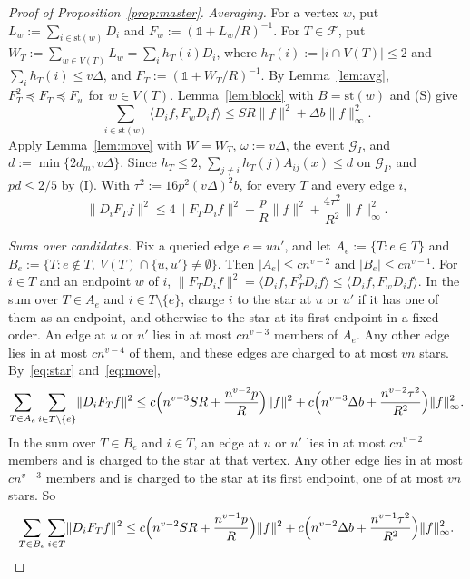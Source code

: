 \documentclass[11pt]{article}
\theoremstyle{remark}
\newcommand{\Fam}{\mathcal{F}}
\newcommand{\st}{\mathrm{st}}
\newcommand{\Id}{\mathbb{1}}
\newcommand{\abs}[1]{\lvert #1\rvert}
\newcommand{\norm}[1]{\lVert #1\rVert}
\newcommand{\ip}[2]{\langle #1, #2\rangle}
\newcommand{\Ev}{\mathcal{G}}
\begin{document}
\begin{proof}[Proof of Proposition~\ref{prop:master}]
\emph{Averaging.} For a vertex $w$, put $L_w:=\sum_{i\in\st(w)}D_i$ and $F_w:=(\Id+L_w/R)^{-1}$. For $T\in\Fam$, put $W_T:=\sum_{w\in V(T)}L_w=\sum_ih_T(i)D_i$, where $h_T(i):=\abs{i\cap V(T)}\le2$ and $\sum_ih_T(i)\le v\Delta$, and $F_T:=(\Id+W_T/R)^{-1}$. By Lemma~\ref{lem:avg}, $F_T^2\preceq F_T\preceq F_w$ for $w\in V(T)$. Lemma~\ref{lem:block} with $B=\st(w)$ and (S) give
\begin{equation}\label{eq:star}
\sum_{i\in\st(w)}\ip{D_if}{F_wD_if}\le SR\norm f^2+\Delta b\norm f_\infty^2.
\end{equation}
Apply Lemma~\ref{lem:move} with $W=W_T$, $\omega:=v\Delta$, the event $\Ev_I$, and $d:=\min\{2d_m,v\Delta\}$. Since $h_T\le2$, $\sum_{j\ne i}h_T(j)A_{ij}(x)\le d$ on $\Ev_I$, and $pd\le2/5$ by (I). With $\tau^2:=16p^2(v\Delta)^2b$, for every $T$ and every edge $i$,
\begin{equation}\label{eq:move}
\norm{D_iF_Tf}^2\le4\norm{F_TD_if}^2+\frac pR\norm f^2+\frac{4\tau^2}{R^2}\norm f_\infty^2.
\end{equation}

\emph{Sums over candidates.} Fix a queried edge $e=uu'$, and let $A_e:=\{T:e\in T\}$ and $B_e:=\{T:e\notin T,\ V(T)\cap\{u,u'\}\ne\emptyset\}$. Then $\abs{A_e}\le cn^{v-2}$ and $\abs{B_e}\le cn^{v-1}$. For $i\in T$ and an endpoint $w$ of $i$, $\norm{F_TD_if}^2=\ip{D_if}{F_T^2D_if}\le\ip{D_if}{F_wD_if}$. In the sum over $T\in A_e$ and $i\in T\setminus\{e\}$, charge $i$ to the star at $u$ or $u'$ if it has one of them as an endpoint, and otherwise to the star at its first endpoint in a fixed order. An edge at $u$ or $u'$ lies in at most $cn^{v-3}$ members of $A_e$. Any other edge lies in at most $cn^{v-4}$ of them, and these edges are charged to at most $vn$ stars. By~\eqref{eq:star} and~\eqref{eq:move},
\begin{equation}\label{eq:sumA}
\sum_{T\in A_e}\sum_{i\in T\setminus\{e\}}\norm{D_iF_Tf}^2\le c\Bigl(n^{v-3}SR+\frac{n^{v-2}p}R\Bigr)\norm f^2+c\Bigl(n^{v-3}\Delta b+\frac{n^{v-2}\tau^2}{R^2}\Bigr)\norm f_\infty^2.
\end{equation}
In the sum over $T\in B_e$ and $i\in T$, an edge at $u$ or $u'$ lies in at most $cn^{v-2}$ members and is charged to the star at that vertex. Any other edge lies in at most $cn^{v-3}$ members and is charged to the star at its first endpoint, one of at most $vn$ stars. So
\begin{equation}\label{eq:sumB}
\sum_{T\in B_e}\sum_{i\in T}\norm{D_iF_Tf}^2\le c\Bigl(n^{v-2}SR+\frac{n^{v-1}p}R\Bigr)\norm f^2+c\Bigl(n^{v-2}\Delta b+\frac{n^{v-1}\tau^2}{R^2}\Bigr)\norm f_\infty^2.
\end{equation}


\end{proof}
\end{document}
